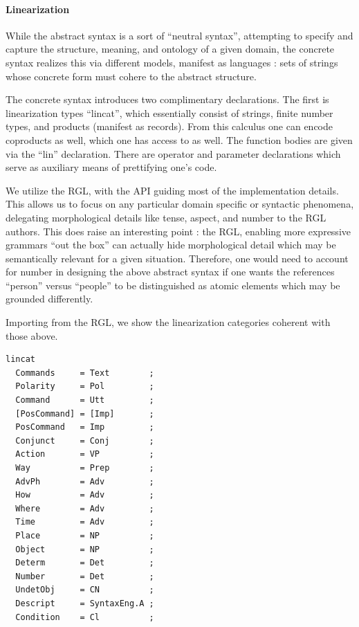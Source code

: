 \documentclass[a4paper, 11pt]{article}
\begin{document}
\paragraph{Linearization}

While the abstract syntax is a sort of ``neutral syntax'', attempting to specify
and capture the structure, meaning, and ontology of a given domain, the concrete
syntax realizes this via different models, manifest as languages : sets of
strings whose concrete form must cohere to the abstract structure. 

The concrete syntax introduces two complimentary declarations. The first is
linearization types ``lincat'', which essentially consist of strings, finite
number types, and products (manifest as records). From this calculus one can
encode coproducts as well, which one has access to as well. The function bodies
are given via the ``lin'' declaration. There are operator and parameter
declarations which serve as auxiliary means of prettifying one's code.

We utilize the RGL, with the API guiding most of the implementation details.
This allows us to focus on any particular domain specific or syntactic
phenomena, delegating morphological details like tense, aspect, and number to the RGL
authors. This does raise an interesting point : the RGL, enabling more
expressive grammars ``out the box'' can actually hide morphological detail which
may be semantically relevant for a given situation. Therefore, one would need to
account for number in designing the above abstract syntax if one wants the
references ``person'' versus ``people'' to be distinguished as atomic elements
which may be grounded differently.

Importing from the RGL, we show the linearization categories coherent with those above.

\begin{verbatim}
lincat
  Commands     = Text        ;
  Polarity     = Pol         ;
  Command      = Utt         ; 
  [PosCommand] = [Imp]       ;
  PosCommand   = Imp         ;
  Conjunct     = Conj        ;
  Action       = VP          ;
  Way          = Prep        ; 
  AdvPh        = Adv         ;
  How          = Adv         ;
  Where        = Adv         ;
  Time         = Adv         ;
  Place        = NP          ;
  Object       = NP          ;
  Determ       = Det         ;
  Number       = Det         ;
  UndetObj     = CN          ;
  Descript     = SyntaxEng.A ;
  Condition    = Cl          ; 
\end{verbatim}
\end{document}
